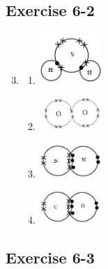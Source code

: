 \subsection{Exercise 6-2} 
\begin{multicols}{2}
\begin{enumerate}[label=\textbf{\arabic*}.]
\setcounter{enumi}{2}
\item %
\begin{enumerate}[label=\textbf{\alph*}.]
 \item \includegraphics[width=0.2\textwidth]{photos/bonding_molecule1.png}
 \item \includegraphics[width=0.2\textwidth]{photos/bonding_molecule2.png}
\item \includegraphics[width=0.2\textwidth]{photos/bonding_molecule3.png}
\item \includegraphics[width=0.2\textwidth]{photos/bonding_molecule4.png}
\end{enumerate}
\end{enumerate}
\end{multicols}
\subsection{Exercise 6-3} 

